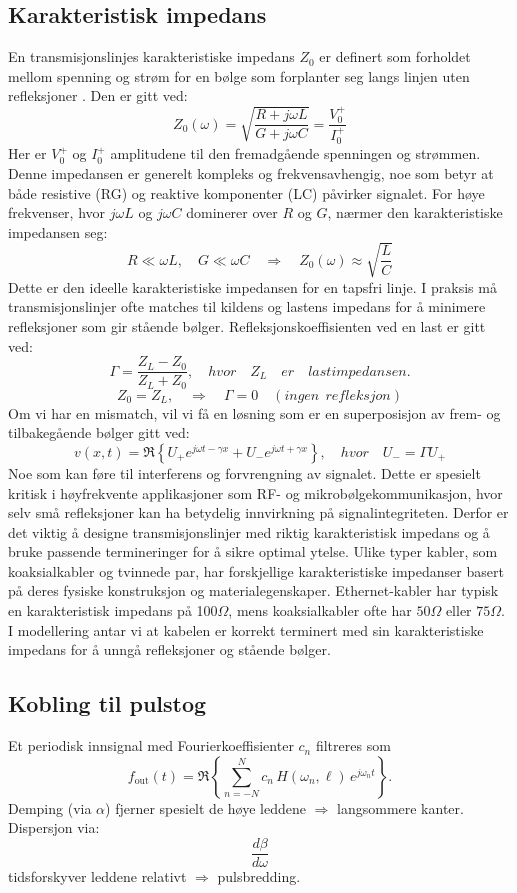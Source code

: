 \subsection{Karakteristisk impedans}
En transmisjonslinjes karakteristiske impedans \(Z_0\) er definert som forholdet mellom spenning og strøm for en bølge som forplanter seg langs linjen uten refleksjoner \cite{HaytBuck2018}. Den er gitt ved:
\[
Z_0(\omega) = \sqrt{\frac{R + j\omega L}{G + j\omega C}} = \frac{V_0^+}{I_0^+} 
\]
Her er \(V_0^+\) og \(I_0^+\) amplitudene til den fremadgående spenningen og strømmen.
Denne impedansen er generelt kompleks og frekvensavhengig, noe som betyr at både resistive (RG) og reaktive komponenter (LC) påvirker signalet. For høye frekvenser, hvor \(j\omega L\) og \(j\omega C\) dominerer over \(R\) og \(G\), nærmer den karakteristiske impedansen seg:
\[
    R \ll \omega L, \quad G \ll \omega C \quad \Rightarrow \quad Z_0(\omega) \approx \sqrt{\frac{L}{C}}
\]
Dette er den ideelle karakteristiske impedansen for en tapsfri linje. I praksis må transmisjonslinjer ofte matches til kildens og lastens impedans for å minimere refleksjoner som gir stående bølger. Refleksjonskoeffisienten ved en last er gitt ved:
\[
    \Gamma = \frac{Z_L - Z_0}{Z_L + Z_0}, \quad hvor \quad Z_L \quad er \quad lastimpedansen.
\]
\[
    Z_0 = Z_L, \quad \Rightarrow \quad \Gamma = 0 \quad (ingen\ \ refleksjon)
\]
Om vi har en mismatch, vil vi få en løsning som er en superposisjon av frem- og tilbakegående bølger gitt ved:
\[
    v(x,t) = \Re\!\left\{ U_+ e^{j\omega t - \gamma x} + U_- e^{j\omega t + \gamma x} \right\}, \quad hvor \quad U_- = \Gamma U_+
\]
\clearpage
\noindent Noe som kan føre til interferens og forvrengning av signalet. Dette er spesielt kritisk i høyfrekvente applikasjoner som RF- og mikrobølgekommunikasjon, hvor selv små refleksjoner kan ha betydelig innvirkning på signalintegriteten. Derfor er det viktig å designe transmisjonslinjer med riktig karakteristisk impedans og å bruke passende termineringer for å sikre optimal ytelse.
Ulike typer kabler, som koaksialkabler og tvinnede par, har forskjellige karakteristiske impedanser basert på deres fysiske konstruksjon og materialegenskaper. Ethernet-kabler har typisk en karakteristisk impedans på 100\(\Omega\), mens koaksialkabler ofte har $50\Omega$ eller $75\Omega$. I modellering antar vi at kabelen er korrekt terminert med sin karakteristiske impedans for å unngå refleksjoner og stående bølger.


\subsection{Kobling til pulstog}
Et periodisk innsignal med Fourierkoeffisienter \(c_n\) filtreres som
\[
f_{\text{out}}(t)=\Re\!\left\{\sum_{n=-N}^{N} c_n\,H(\omega_n,\ell)\,e^{j\omega_n t}\right\}.
\]
Demping (via \(\alpha\)) fjerner spesielt de høye leddene \(\Rightarrow\) langsommere kanter.\\
Dispersjon via: 
\[\frac{d\beta}{d\omega}\] 
tidsforskyver leddene relativt \(\Rightarrow\) pulsbredding.

